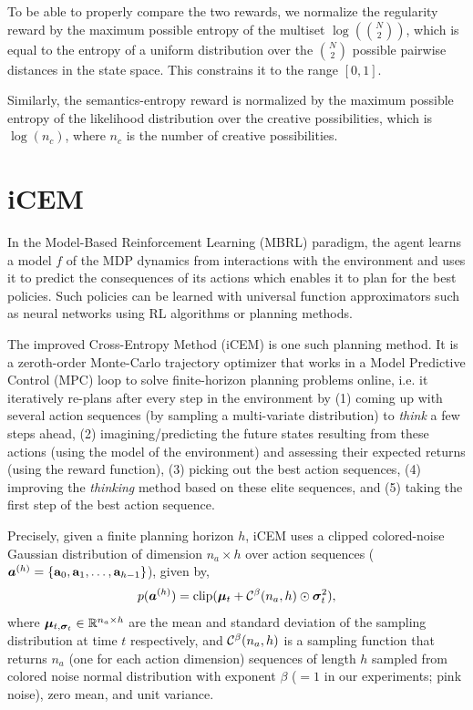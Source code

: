 To be able to properly compare the two rewards, we normalize the regularity reward by the maximum possible entropy of the multiset \(\log\left(\binom{N}{2}\right)\), which is equal to the entropy of a uniform distribution over the \(\binom{N}{2}\) possible pairwise distances in the state space.
This constrains it to the range \([0, 1]\).

Similarly, the semantics-entropy reward is normalized by the maximum possible entropy of the likelihood distribution over the creative possibilities, which is \(\log(n_c)\), where \(n_c\) is the number of creative possibilities.

\section{iCEM}
\label{sec:icem}

In the Model-Based Reinforcement Learning (MBRL) paradigm, the agent learns a model \(f\) of the MDP dynamics from interactions with the environment and uses it to predict the consequences of its actions which enables it to plan for the best policies.
Such policies can be learned with universal function approximators such as neural networks using RL algorithms or planning methods.

The improved Cross-Entropy Method (iCEM) is one such planning method.
It is a zeroth-order Monte-Carlo trajectory optimizer that works in a Model Predictive Control (MPC) loop to solve finite-horizon planning problems online, i.e. it iteratively re-plans after every step in the environment by (1) coming up with several action sequences (by sampling a multi-variate distribution) to \emph{think} a few steps ahead, (2) imagining/predicting the future states resulting from these actions (using the model of the environment) and assessing their expected returns (using the reward function), (3) picking out the best action sequences, (4) improving the \emph{thinking} method based on these elite sequences, and (5) taking the first step of the best action sequence.

Precisely, given a finite planning horizon \(h\), iCEM uses a clipped colored-noise Gaussian distribution of dimension \(n_a \times h\) over action sequences (\(\bm{a}^{(h)} = \{ \mathbf{a}_0, \mathbf{a}_1, \ldots, \mathbf{a}_{h-1} \}\)), given by,
\begin{equation}
    \label{eq:icem-distribution}
    p(\bm{a}^{(h)}) = \text{clip}(\bm{\mu}_t + \mathcal{C}^\beta(n_a, h) \odot \bm{\sigma}_t^2),
\end{equation}
where \(\bm{\mu}_{t, \bm{\sigma}_{t}} \in \mathbb{R}^{n_a \times h}\) are the mean and standard deviation of the sampling distribution at time \(t\) respectively, and \(\mathcal{C}^\beta(n_a, h)\) is a sampling function that returns \(n_a\) (one for each action dimension) sequences of length \(h\) sampled from colored noise normal distribution with exponent \(\beta\) (\(= 1\) in our experiments; pink noise), zero mean, and unit variance.

